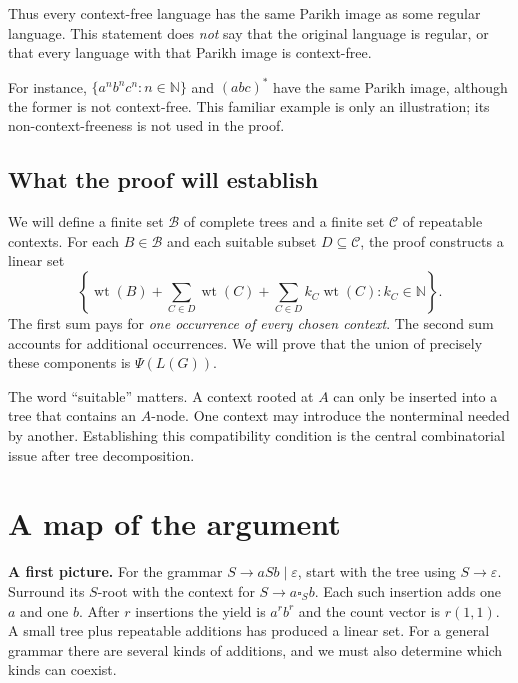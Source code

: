 \documentclass[11pt,a4paper]{article}
\numberwithin{equation}{section}
\theoremstyle{plain}
\theoremstyle{definition}
\theoremstyle{remark}
\newcommand{\N}{\mathbb N}
\newcommand{\eps}{\varepsilon}
\newcommand{\wt}{\operatorname{wt}}
\newcommand{\Bases}{\mathcal B}
\newcommand{\Cycles}{\mathcal C}
\newcommand{\hole}[1]{\square_{#1}}
\begin{document}
Thus every context-free language has the same Parikh image as some regular language. This statement does \emph{not} say that the original language is regular, or that every language with that Parikh image is context-free.

For instance, $\{a^n b^n c^n:n\in\N\}$ and $(abc)^*$ have the same Parikh image, although the former is not context-free. This familiar example is only an illustration; its non-context-freeness is not used in the proof.

\subsection{What the proof will establish}
We will define a finite set $\Bases$ of complete trees and a finite set $\Cycles$ of repeatable contexts. For each $B\in\Bases$ and each suitable subset $D\subseteq\Cycles$, the proof constructs a linear set
\begin{equation}\label{eq:preview}
\left\{\wt(B)+\sum_{C\in D}\wt(C)
       +\sum_{C\in D}k_C\wt(C):k_C\in\N\right\}.
\end{equation}
The first sum pays for \emph{one occurrence of every chosen context}. The second sum accounts for additional occurrences. We will prove that the union of precisely these components is $\Psi(L(G))$.

The word ``suitable'' matters. A context rooted at $A$ can only be inserted into a tree that contains an $A$-node. One context may introduce the nonterminal needed by another. Establishing this compatibility condition is the central combinatorial issue after tree decomposition.

\section{A map of the argument}\label{sec:map}

\textbf{A first picture.} For the grammar $S\to aSb\mid\eps$, start with the tree using $S\to\eps$. Surround its $S$-root with the context for $S\to a\hole S b$. Each such insertion adds one $a$ and one $b$. After $r$ insertions the yield is $a^r b^r$ and the count vector is $r(1,1)$. A small tree plus repeatable additions has produced a linear set. For a general grammar there are several kinds of additions, and we must also determine which kinds can coexist.
\end{document}
